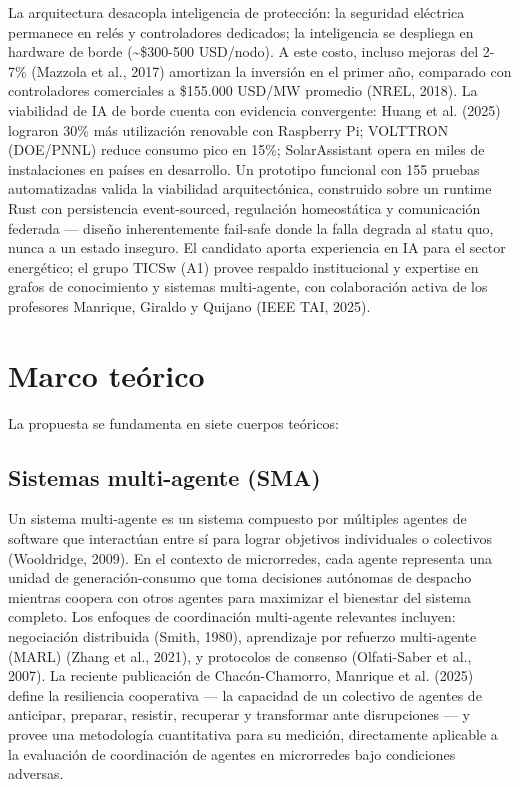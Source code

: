 \documentclass[12pt,letterpaper]{article}
\begin{document}
La arquitectura desacopla inteligencia de protecci\'on: la seguridad el\'ectrica permanece en rel\'es y controladores dedicados; la inteligencia se despliega en hardware de borde (\textasciitilde\$300-500 USD/nodo). A este costo, incluso mejoras del 2-7\% (Mazzola et al., 2017) amortizan la inversi\'on en el primer a\~no, comparado con controladores comerciales a \$155.000 USD/MW promedio (NREL, 2018). La viabilidad de IA de borde cuenta con evidencia convergente: Huang et al. (2025) lograron 30\% m\'as utilizaci\'on renovable con Raspberry Pi; VOLTTRON (DOE/PNNL) reduce consumo pico en 15\%; SolarAssistant opera en miles de instalaciones en pa\'ises en desarrollo. Un prototipo funcional con 155 pruebas automatizadas valida la viabilidad arquitect\'onica, construido sobre un runtime Rust con persistencia event-sourced, regulaci\'on homeost\'atica y comunicaci\'on federada --- dise\~no inherentemente fail-safe donde la falla degrada al statu quo, nunca a un estado inseguro. El candidato aporta experiencia en IA para el sector energ\'etico; el grupo TICSw (A1) provee respaldo institucional y expertise en grafos de conocimiento y sistemas multi-agente, con colaboraci\'on activa de los profesores Manrique, Giraldo y Quijano (IEEE TAI, 2025).

\section{Marco te\'orico}

La propuesta se fundamenta en siete cuerpos te\'oricos:

\subsection{Sistemas multi-agente (SMA)}

Un sistema multi-agente es un sistema compuesto por m\'ultiples agentes de software que interact\'uan entre s\'i para lograr objetivos individuales o colectivos (Wooldridge, 2009). En el contexto de microrredes, cada agente representa una unidad de generaci\'on-consumo que toma decisiones aut\'onomas de despacho mientras coopera con otros agentes para maximizar el bienestar del sistema completo. Los enfoques de coordinaci\'on multi-agente relevantes incluyen: negociaci\'on distribuida (Smith, 1980), aprendizaje por refuerzo multi-agente (MARL) (Zhang et al., 2021), y protocolos de consenso (Olfati-Saber et al., 2007). La reciente publicaci\'on de Chac\'on-Chamorro, Manrique et al. (2025) define la resiliencia cooperativa --- la capacidad de un colectivo de agentes de anticipar, preparar, resistir, recuperar y transformar ante disrupciones --- y provee una metodolog\'ia cuantitativa para su medici\'on, directamente aplicable a la evaluaci\'on de coordinaci\'on de agentes en microrredes bajo condiciones adversas.
\end{document}
